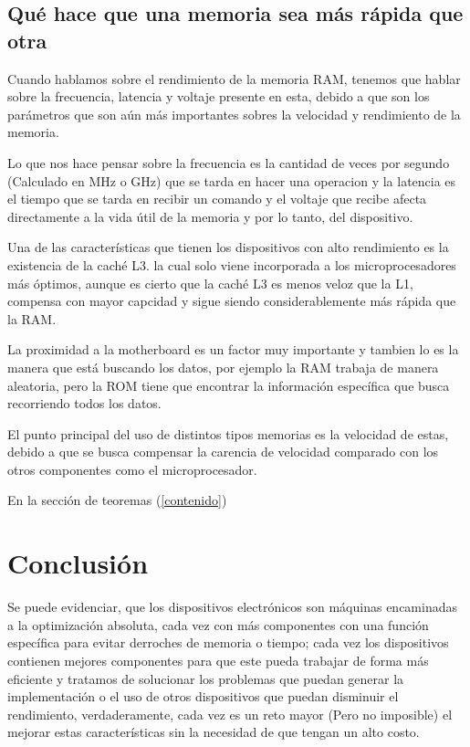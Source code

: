 \documentclass{article}
\begin{document}
\subsection{Qué hace que una memoria sea más rápida que otra}
Cuando hablamos sobre el rendimiento de la memoria RAM, tenemos que hablar sobre la frecuencia, latencia y voltaje presente en esta, debido a que son los parámetros que son aún más importantes sobres
 la velocidad y rendimiento de la memoria.
 
\vspace{0,5 cm}

Lo que nos hace pensar sobre la frecuencia es la cantidad
de veces por segundo (Calculado en MHz o GHz) que se tarda en hacer una operacion y la latencia es el
tiempo que se tarda en recibir un comando y el voltaje que recibe afecta directamente a la vida útil de la memoria y por lo tanto, del dispositivo.

\vspace{0,5 cm}

Una de las características que tienen los dispositivos con alto rendimiento es la existencia de la caché L3. la cual solo viene incorporada a los microprocesadores más óptimos, aunque es cierto que la caché L3 es menos veloz que la L1, compensa con mayor capcidad y sigue siendo considerablemente más rápida que la RAM.

\vspace{0,5 cm}
La proximidad a la motherboard es un factor muy importante y tambien lo es la manera  que está buscando los datos, por ejemplo la RAM trabaja de manera aleatoria, pero la ROM tiene que encontrar la información específica que busca recorriendo todos los datos.

\vspace{0,5 cm}

El punto principal del uso de distintos tipos memorias es la velocidad de estas, debido a que  se busca compensar la carencia de velocidad comparado con los otros componentes como  el microprocesador.



\vspace{2,0 cm}



En la sección de teoremas (\ref{contenido})

\section{Conclusión} \label{conclulsion}
Se puede evidenciar, que los dispositivos electrónicos son máquinas encaminadas a la optimización absoluta, cada vez con más componentes con una función específica para evitar derroches de memoria o tiempo; cada vez los dispositivos contienen mejores componentes para que este pueda trabajar de forma más eficiente y tratamos de solucionar los problemas que puedan generar la implementación o el uso de otros dispositivos que puedan disminuir el rendimiento, verdaderamente, cada vez es un reto mayor (Pero no imposible) el mejorar estas características sin la necesidad de que tengan un alto costo.



\end{document}
